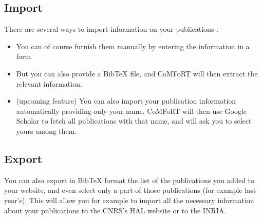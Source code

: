\documentclass{article}
\begin{document}
\subsection{Import}
There are several ways to import information on your publications  : 
   \begin{itemize}
    \item{You can of course furnish them manually by entering the information in a form.
    }
    \item{But you can also provide a BibTeX file, and CoMFoRT will then extract the relevant information.
	} 
    \item{(upcoming feature) You can also import your publication information automatically providing only your name. CoMFoRT will then use Google Scholar to fetch all publications with that name, and will ask you to select yours among them.
	 } 
   \end{itemize}
\subsection{Export}
You can also export in BibTeX format the list of the publications you added to your website, and even select only a part of those publications (for example last year's). 
This will allow you for example to import all the necessary information about your publications to the CNRS's HAL website or to the INRIA. 

\end{document}
